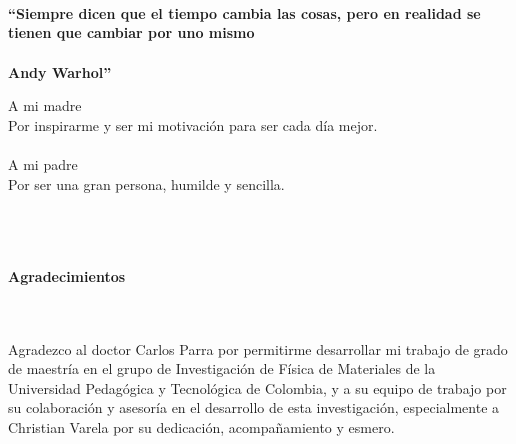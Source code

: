 \newpage{\pagestyle{empty}}%

\newpage
\thispagestyle{empty} \textbf{}\normalsize
\\\\\\%
\textbf{``Siempre dicen que el tiempo cambia las cosas, pero en realidad se tienen que cambiar por uno mismo\"\\\\
Andy Warhol''}\\[4.0cm]

\begin{flushright}
    \begin{minipage}{8cm}
        \noindent
        \small
        A mi madre\\
        Por inspirarme y ser mi motivación para ser cada día mejor. \\
        [1.0cm]\\
        A mi padre\\
        Por ser una gran persona, humilde y sencilla.
        \\
        
    \end{minipage}
\end{flushright}

\newpage{\pagestyle{empty}}%

\newpage
\thispagestyle{empty} \textbf{}\normalsize
\\\\\\%
\textbf{\LARGE Agradecimientos}
{}\\\\

Agradezco al doctor Carlos Parra por permitirme desarrollar mi trabajo de grado de maestría 
en el grupo de Investigación de Física de Materiales de la Universidad Pedagógica y Tecnológica de Colombia, 
y a su equipo de trabajo por su colaboración y asesoría en el desarrollo de esta investigación, 
especialmente a Christian Varela por su dedicación, acompañamiento y esmero.

\newpage{\pagestyle{empty}}%

